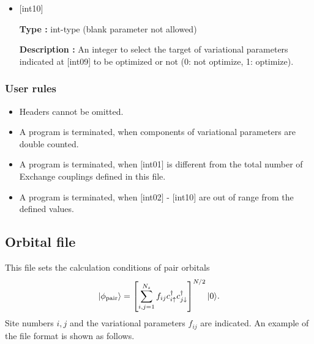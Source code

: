\begin{itemize}
  {\bf Description :} 
  An integer giving kinds of variational  parameters. The value is $(2n+s)\times$[int01]$+t$, where $n$, $s$ and $t$ are given by the following relation:
  \begin{itemize}
  \item{$n$}: The number of doublon (holon) around the center site (0, 1, 2, 3, 4),  \\
  \item{$s$}: When the center is doublon (holon), s=0 (1), \\
  \item{$t$}: The kind of variational parameters (0, $\cdots$ [int1]-1).
  \end{itemize}  
  
 \item  $[$int10$]$
   
   {\bf Type :} int-type (blank parameter not allowed)

  {\bf Description :} An integer to select the target of variational parameters indicated at [int09] to be optimized or not (0: not optimize, 1: optimize).
  
\end{itemize}

\subsubsection{User rules}
\begin{itemize}
\item Headers cannot be omitted. 
\item A program is terminated, when components of variational parameters are double counted.
\item A program is terminated, when $[$int01$]$ is different from the total number of Exchange couplings defined in this file.
\item A program is terminated, when $[$int02$]$ - $[$int10$]$ are out of range from the defined values.
\end{itemize}

\newpage
\subsection{Orbital file}
\label{Subsec:Orbital}
This file sets the calculation conditions of pair orbitals
\begin{equation}
|\phi_{\rm pair} \rangle = \left[\sum_{i, j=1}^{N_s} f_{ij}c_{i\uparrow}^{\dag}c_{j\downarrow}^{\dag} \right]^{N/2}|0 \rangle.
\end{equation}
Site numbers $i, j$ and the variational parameters $f_{ij}$ are indicated.
An example of the file format is shown as follows.


